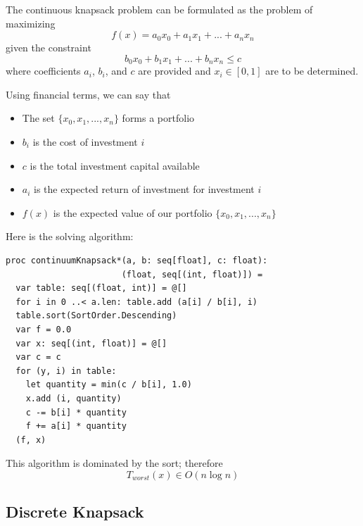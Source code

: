 \documentclass[justified, sixbynine]{tufte-book}
\def\ft{\small\tt}
\theoremstyle{plain}%
\newtheorem * {corollary}{Corollary}
\theoremstyle{definition}
\theoremstyle{remark}
\newtheorem * {remark}{Remark}
\newtheorem * {note}{Note}
\begin{document}
\begin{fullwidth}
The continuous knapsack problem can be formulated as the problem of
maximizing
\begin{equation}
f(x)=a_0x_0+a_1x_1+...+a_nx_n
\end{equation}
given the constraint
\begin{equation}
b_0x_0+b_1x_1+...+b_nx_n\leq c
\end{equation}
where coefficients $a_i$, $b_i$, and $c$ are provided and $x_i\in [0, 1]$ are
to be determined.

Using financial terms, we can say that

\begin{itemize}
\item  The set $\{x_0, x_1, ..., x_n\}$ forms a portfolio

\item  $b_i$ is the cost of investment $i$

\item  $c$ is the total investment capital available

\item  $a_i$ is the expected return of investment for investment $i$

\item  $f(x)$ is the expected value of our portfolio $\{x_0, x_1, ..., x_n\}$
\end{itemize}

Here is the solving algorithm:

\begin{lstlisting}[caption={in file: {\ft nlib/finance.nim}}]
proc continuumKnapsack*(a, b: seq[float], c: float):
                       (float, seq[(int, float)]) =
  var table: seq[(float, int)] = @[]
  for i in 0 ..< a.len: table.add (a[i] / b[i], i)
  table.sort(SortOrder.Descending)
  var f = 0.0
  var x: seq[(int, float)] = @[]
  var c = c
  for (y, i) in table:
    let quantity = min(c / b[i], 1.0)
    x.add (i, quantity)
    c -= b[i] * quantity
    f += a[i] * quantity
  (f, x)
\end{lstlisting}

This algorithm is dominated by the sort; therefore
\begin{equation}
T_{worst}(x)\in O(n\log n)
\end{equation}

\subsection{Discrete Knapsack}


\end{fullwidth}
\end{document}
